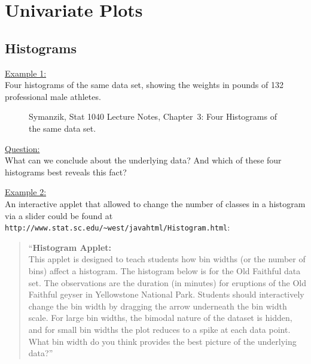 
\def\jsprivatechfive{1} %



\section{Univariate Plots}



\subsection{Histograms}


\noindent
\underline{Example 1:} \\
Four histograms of the same data set, showing the
weights in pounds of 132 professional male athletes.

\begin{figure}[ht]
\caption{\label{Stat1040_histograms}
Symanzik, Stat 1040 Lecture Notes, Chapter~3: Four Histograms of the same data set.
}
\end{figure}


\noindent
\underline{Question:} \\
What can we conclude about the underlying data? 
And which of these four histograms best reveals this fact?


\newpage


\noindent
\underline{Example 2:} \\
An interactive applet that allowed to change the number of classes
in a histogram via a slider could be found at
\verb|http://www.stat.sc.edu/~west/javahtml/Histogram.html|:
\begin{quotation}
\noindent
``{\bf Histogram Applet:} \\[0.2cm]
This applet is designed to teach students how bin widths (or the number of bins) 
affect a histogram. The histogram below is for the Old Faithful data set. The observations 
are the duration (in minutes) for eruptions of the Old Faithful geyser in 
Yellowstone National Park. Students should interactively change the bin width 
by dragging the arrow underneath the bin width scale. For large bin widths, 
the bimodal nature of the dataset is hidden, and for small bin widths the plot 
reduces to a spike at each data point. What bin width do you think provides 
the best picture of the underlying data?''
\end{quotation}


